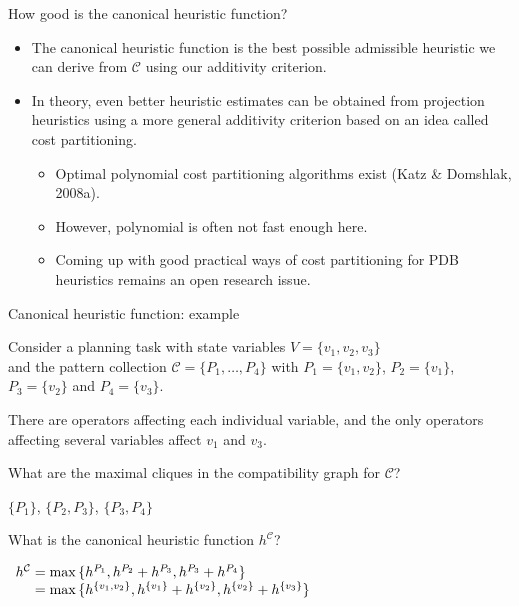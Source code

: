 \documentclass{gkibeamer}
\begin{document}
\begin{frame}{How good is the canonical heuristic function?}
  \begin{itemize}
  \item The canonical heuristic function is the \alert{best possible}
    admissible heuristic we can derive from $\mathcal C$ using
    \alert{our additivity criterion}.
  \item In theory, even better heuristic estimates can be obtained from
    projection heuristics using a \alert{more general additivity
      criterion} based on an idea called \alert{cost partitioning}.
    \begin{itemize}
    \item Optimal polynomial cost partitioning algorithms exist
      (Katz \& Domshlak, 2008a).
    \item However, polynomial is often not fast enough here.
    \item Coming up with good practical ways of cost partitioning for
      PDB heuristics remains an open research issue.
    \end{itemize}
  \end{itemize}
\end{frame}

\begin{frame}{Canonical heuristic function: example}
  \begin{example}
    Consider a planning task with state variables $V = \{v_1, v_2,
    v_3\}$ \\ and the pattern collection $\mathcal C = \{P_1, \dots,
    P_4\}$ with $P_1 = \{v_1, v_2\}$, $P_2 = \{v_1\}$, $P_3 =
    \{v_2\}$ and $P_4 = \{v_3\}$.

    \smallskip

    There are operators affecting each individual variable, and the
    only operators affecting several variables affect $v_1$ and $v_3$.

    \smallskip

    What are the maximal cliques in the compatibility graph for
    $\mathcal C$?

    \pause
    \medskip

     $\{P_1\}$, $\{P_2, P_3\}$, $\{P_3, P_4\}$

    \pause
    \medskip

    What is the canonical heuristic function $h^{\mathcal C}$?

    \pause
    \medskip

    $\begin{array}[t]{r@{}l}
      h^{\mathcal C} & {} = \max\,\{
        h^{P_1},
        h^{P_2} + h^{P_3},
        h^{P_3} + h^{P_4}
      \} \\
      & {} = \max\,\{
        h^{\{v_1, v_2\}},
        h^{\{v_1\}} + h^{\{v_2\}},
        h^{\{v_2\}} + h^{\{v_3\}}
        \}
    \end{array}$
  \end{example}
\end{frame}
\end{document}
